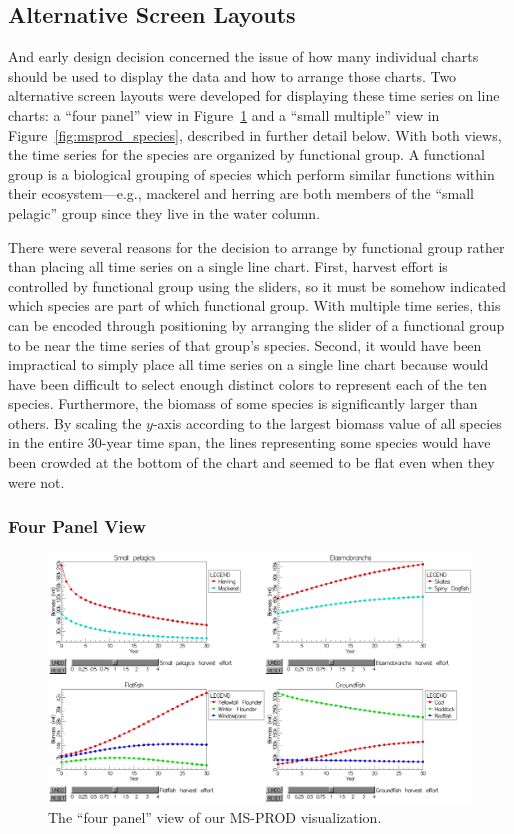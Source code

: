 \subsection{Alternative Screen Layouts}

And early design decision concerned the issue of how many individual charts should be used to display the data and how to arrange those charts.  Two alternative screen layouts were developed for displaying these time series on line charts: a ``four panel'' view in Figure~\ref{fig:msprod_group} and a ``small multiple'' view in Figure~\ref{fig:msprod_species}, described in further detail below.  With both views, the time series for the species are organized by functional group.  A functional group is a biological grouping of species which perform similar functions within their ecosystem---e.g., mackerel and herring are both members of the ``small pelagic'' group since they live in the water column.

There were several reasons for the decision to arrange by functional group rather than placing all time series on a single line chart.  First, harvest effort is controlled by functional group using the sliders, so it must be somehow indicated which species are part of which functional group.  With multiple time series, this can be encoded through positioning by arranging the slider of a functional group to be near the time series of that group's species.  Second, it would have been impractical to simply place all time series on a single line chart because would have been difficult to select enough distinct colors to represent each of the ten species.  Furthermore, the biomass of some species is significantly larger than others.  By scaling the $y$-axis according to the largest biomass value of all species in the entire 30-year time span, the lines representing some species would have been crowded at the bottom of the chart and seemed to be flat even when they were not.

\subsubsection{Four Panel View}

\begin{figure}[h]
	\centering
	\includegraphics[width=14cm]{figures/png/msprod_group.png}
	\caption{The ``four panel'' view of our MS-PROD visualization.}
	\label{fig:msprod_group}
\end{figure}

